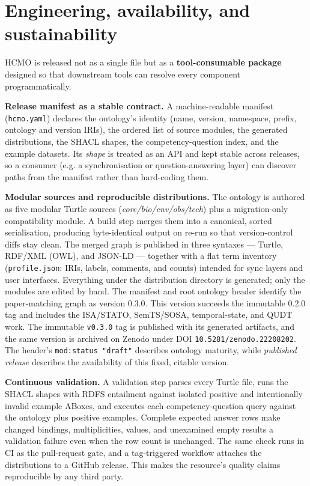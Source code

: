 \section{Engineering, availability, and sustainability}
HCMO is released not as a single file but as a \textbf{tool-consumable package} designed so that downstream tools can resolve every component programmatically.

\textbf{Release manifest as a stable contract.} A machine-readable manifest (\nolinkurl{hcmo.yaml}) declares the ontology's identity (name, version, namespace, prefix, ontology and version IRIs), the ordered list of source modules, the generated distributions, the SHACL shapes, the competency-question index, and the example datasets. Its \emph{shape} is treated as an API and kept stable across releases, so a consumer (e.g. a synchronisation or question-answering layer) can discover paths from the manifest rather than hard-coding them.

\textbf{Modular sources and reproducible distributions.} The ontology is authored as five modular Turtle sources (\emph{core/bio/env/obs/tech}) plus a migration-only compatibility module. A build step merges them into a canonical, sorted serialisation, producing byte-identical output on re-run so that version-control diffs stay clean. The merged graph is published in three syntaxes --- Turtle, RDF/XML (OWL), and JSON-LD --- together with a flat term inventory (\nolinkurl{profile.json}: IRIs, labels, comments, and counts) intended for sync layers and user interfaces. Everything under the distribution directory is generated; only the modules are edited by hand. The manifest and root ontology header identify the paper-matching graph as version 0.3.0. This version succeeds the immutable 0.2.0 tag and includes the ISA/STATO, SemTS/SOSA, temporal-state, and QUDT work. The immutable \nolinkurl{v0.3.0} tag is published with its generated artifacts, and the same version is archived on Zenodo under DOI \nolinkurl{10.5281/zenodo.22208202}. The header's \nolinkurl{mod:status "draft"} describes ontology maturity, while \emph{published release} describes the availability of this fixed, citable version.

\textbf{Continuous validation.} A validation step parses every Turtle file, runs the SHACL shapes with RDFS entailment against isolated positive and intentionally invalid example ABoxes, and executes each competency-question query against the ontology plus positive examples. Complete expected answer rows make changed bindings, multiplicities, values, and unexamined empty results a validation failure even when the row count is unchanged. The same check runs in CI as the pull-request gate, and a tag-triggered workflow attaches the distributions to a GitHub release. This makes the resource's quality claims reproducible by any third party.

